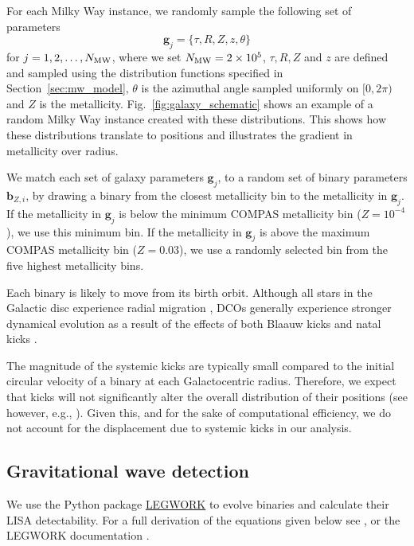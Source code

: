For each Milky Way instance, we randomly sample the following set of parameters
\begin{equation}
    \mathbf{g}_{{j}} = \{\tau, R, Z, z, \theta\}
\end{equation}
for $j = 1, 2, \dots, N_{\rm MW}$, where we set $N_{\rm MW} = 2 \times 10^{5}$, $\tau, R, Z$ and $z$ are defined and sampled using the distribution functions specified in Section~\ref{sec:mw_model}, $\theta$ is the azimuthal angle sampled uniformly on $[0, 2\pi)$ and $Z$ is the metallicity. Fig.~\ref{fig:galaxy_schematic} shows an example of a random Milky Way instance created with these distributions. This shows how these distributions translate to positions and illustrates the gradient in metallicity over radius.

We match each set of galaxy parameters $\mathbf{g}_{{j}}$, to a random set of binary parameters $\mathbf{b}_{{Z, i}}$, by drawing a binary from the closest metallicity bin to the metallicity in $\mathbf{g}_{{j}}$. If the metallicity in $\mathbf{g}_{{j}}$ is below the minimum COMPAS metallicity bin ($Z = 10^{-4}$), we use this minimum bin. If the metallicity in $\mathbf{g}_{{j}}$ is above the maximum COMPAS metallicity bin ($Z = 0.03$), we use a randomly selected bin from the five highest metallicity bins.

Each binary is likely to move from its birth orbit. Although all stars in the Galactic disc experience radial migration \citep{Sellwood+2002, Frankel+2018}, DCOs generally experience stronger dynamical evolution as a result of the effects of both Blaauw kicks \citep{Blaauw+1961} and natal kicks \citep[e.g.][]{Hobbs+2005}.

The magnitude of the systemic kicks are typically small compared to the initial circular velocity of a binary at each Galactocentric radius. Therefore, we expect that kicks will not significantly alter the overall distribution of their positions (see however, e.g., \citealt{Brandt+1995, Abbott+2017_GW170817_progenitor}). Given this, and for the sake of computational efficiency, we do not account for the displacement due to systemic kicks in our analysis.

\subsection{Gravitational wave detection}\label{sec:gw_detection}
We use the Python package \href{https://legwork.readthedocs.io/en/latest/}{LEGWORK} \citep{Wagg+2021} to evolve binaries and calculate their LISA detectability. For a full derivation of the equations given below see \citep[][Section~3]{Wagg+2021}, or the LEGWORK documentation \href{https://legwork.readthedocs.io/en/latest/notebooks/Derivations.html}{\faBook}.

